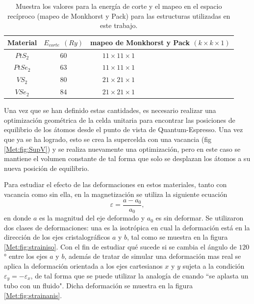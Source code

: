   \begin{table} [!h]
  	\centering
  	\caption[Valores de la energ\'ia de corte y mapeo de Monkhorst-Pack.]{Muestra los valores para la energ\'ia de corte y el mapeo en el espacio rec\'iproco (mapeo de Monkhorst y Pack) para las estructuras utilizadas en este trabajo.}
  	\begin{tabular}{|c|c|m{5 cm}|} 
  		\hline
  		Material       &   $E_{corte}~~(Ry)$     & mapeo de Monkhorst y Pack $(k\times k \times 1)$  \\
  		\hline
  		\hline
  		$PtS_2$        &   $60 $             &  $~~~~~~~~11 \times 11 \times 1$ \\
  		$PtSe_2$        &   $63 $             &  $~~~~~~~~11 \times 11 \times 1$ \\
  		$VS_2$        &   $80 $             &  $~~~~~~~~21 \times 21 \times 1$ \\
  		$VSe_2$        &   $84 $             &  $~~~~~~~~21 \times 21 \times 1$ \\
  		 \hline
  	\end{tabular}
    
    \label{Met:Tab:Eckk1}
  \end{table}
  \newline
  \par Una vez que se han definido estas cantidades, es necesario realizar una optimizaci\'on geom\'etrica de la celda unitaria para encontrar las posiciones  de equilibrio de los \'atomos desde el punto de vista de Quantum-Espresso. Una vez que ya se ha logrado, esto se crea la supercelda con una vacancia (fig \ref{Met:fig:SupV}) y se realiza nuevamente una optimizaci\'on, pero en este caso se mantiene el volumen constante de tal forma que solo se desplazan los \'atomos a su nueva posici\'on de equilibrio.
  \newline
  \par Para estudiar el efecto de las  deformaciones en estos materiales, tanto con vacancia como sin ella, en la magnetizaci\'on se utiliza la siguiente ecuaci\'on
  \begin{equation}
  \varepsilon = \frac{a-a_0}{a_0}, \label{Met:ec:strain}
  \end{equation} 
  en donde $a$ es la magnitud del eje deformado y $a_0$ es sin deformar. Se utilizaron dos clases de deformaciones: una es la isotr\'opica en cual la deformaci\'on est\'a en la direcci\'on de los ejes cristalogr\'aficos $a$ y $b$, tal como se muestra en la figura \ref{Met:fig:strainiso}. Con el fin de  estudiar qu\'e sucede si se cambia el \'angulo de $120$° entre los ejes $a$ y $b$, adem\'as de tratar de simular una deformaci\'on mas real se aplica la deformaci\'on orientada a los ejes cartesianos $x$ y $y$ sujeta a la condici\'on $\varepsilon_y = -\varepsilon_x$, de tal forma que se puede utilizar la analog\'ia de cuando ``se aplasta un tubo con un fluido".  Dicha deformaci\'on se muestra en la figura \ref{Met:fig:strainanis}.

